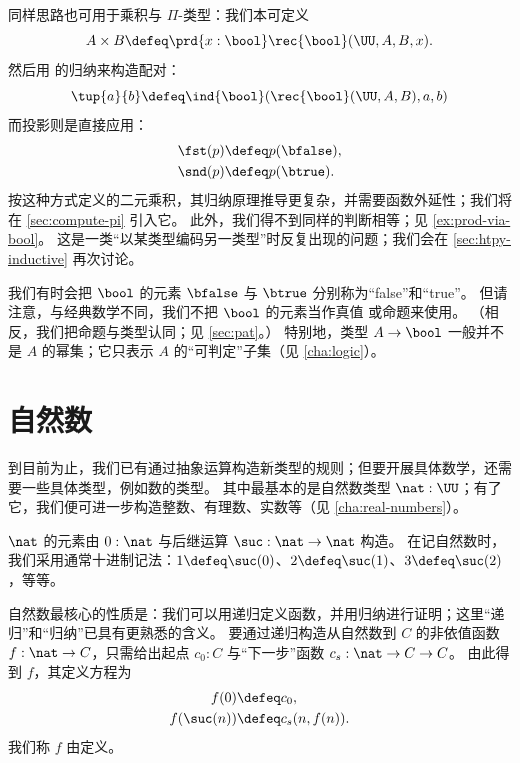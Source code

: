 同样思路也可用于乘积与 $\Pi$-类型：我们本可定义
\[ A \times B \defeq \prd{x:\bool}\rec{\bool}(\UU,A,B,x). \]
然后用 \bool 的归纳来构造配对：
\[ \tup{a}{b} \defeq \ind{\bool}(\rec{\bool}(\UU,A,B),a,b) \]
而投影则是直接应用：
\begin{align*}
  \fst(p) &\defeq p(\bfalse), \\
  \snd(p) &\defeq p(\btrue).
\end{align*}
按这种方式定义的二元乘积，其归纳原理推导更复杂，并需要函数外延性；我们将在 \cref{sec:compute-pi} 引入它。
此外，我们得不到同样的判断相等；见 \cref{ex:prod-via-bool}。
这是一类“以某类型编码另一类型”时反复出现的问题；我们会在 \cref{sec:htpy-inductive} 再次讨论。 

我们有时会把 $\bool$ 的元素 $\bfalse$ 与 $\btrue$ 分别称为“false”和“true”。
但请注意，与经典数学不同，我们不把 $\bool$ 的元素当作真值
%
或命题来使用。
（相反，我们把命题与类型认同；见 \cref{sec:pat}。）
特别地，类型 $A \to \bool$ 一般并不是 $A$ 的幂集；它只表示 $A$ 的“可判定”子集（见 \cref{cha:logic}）。
%

%


\section{自然数}
\label{sec:inductive-types}

%
%
%
到目前为止，我们已有通过抽象运算构造新类型的规则；但要开展具体数学，还需要一些具体类型，例如数的类型。
其中最基本的是自然数类型 $\nat : \UU$；有了它，我们便可进一步构造整数、有理数、实数等（见 \cref{cha:real-numbers}）。

$\nat$ 的元素由 $0 : \nat$ 与后继运算 $\suc : \nat \to \nat$ 构造。
在记自然数时，我们采用通常十进制记法：$1 \defeq \suc(0)$、$2 \defeq \suc(1)$、$3 \defeq \suc(2)$，等等。

自然数最核心的性质是：我们可以用递归定义函数，并用归纳进行证明；这里“递归”和“归纳”已具有更熟悉的含义。
%
要通过递归构造从自然数到 $C$ 的非依值函数 $f : \nat \to C$，只需给出起点 $c_0 : C$ 与“下一步”函数 $c_s : \nat \to C \to C$。
由此得到 $f$，其定义方程为
\begin{align*}
  f(0) &\defeq c_0, \\
  f(\suc(n)) &\defeq c_s(n,f(n)).
\end{align*}
我们称 $f$ 由定义。
%
%

